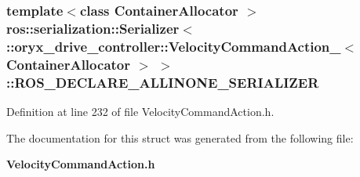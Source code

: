 \subsubsection[{\-R\-O\-S\-\_\-\-D\-E\-C\-L\-A\-R\-E\-\_\-\-A\-L\-L\-I\-N\-O\-N\-E\-\_\-\-S\-E\-R\-I\-A\-L\-I\-Z\-E\-R}]{\setlength{\rightskip}{0pt plus 5cm}template$<$class Container\-Allocator $>$ ros\-::serialization\-::\-Serializer$<$ \-::{\bf oryx\-\_\-drive\-\_\-controller\-::\-Velocity\-Command\-Action\-\_\-}$<$ \-Container\-Allocator $>$ $>$\-::{\bf \-R\-O\-S\-\_\-\-D\-E\-C\-L\-A\-R\-E\-\_\-\-A\-L\-L\-I\-N\-O\-N\-E\-\_\-\-S\-E\-R\-I\-A\-L\-I\-Z\-E\-R}}\label{structros_1_1serialization_1_1Serializer_3_01_1_1oryx__drive__controller_1_1VelocityCommandActio85240348fce0b112f3ee2ecf2fec4ad8_a48fc75c7b3ba057e6b8429a43ffa33f5}


\-Definition at line 232 of file \-Velocity\-Command\-Action.\-h.



\-The documentation for this struct was generated from the following file\-:\begin{DoxyCompactItemize}
\item 
{\bf \-Velocity\-Command\-Action.\-h}\end{DoxyCompactItemize}
